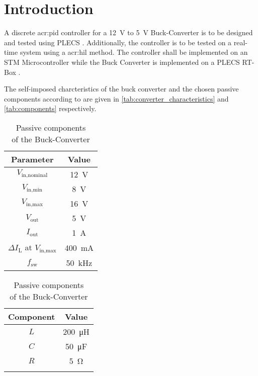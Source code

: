 \chapter{Introduction}
\label{chapter:introduction}

A discrete \gls{acr:pid} controller for a \qty{12}{\volt} to \qty{5}{\volt} Buck-Converter is to be designed and tested using PLECS \autocite{PLECSPlexim}.
Additionally, the controller is to be tested on a real-time system using a \gls{acr:hil} method. The controller shall be implemented on an STM Microcontroller while the Buck Converter is implemented on a PLECS RT-Box \autocite{RTBoxPlexim}.

The self-imposed charcteristics of the buck converter and the chosen passive components according to \autocite{BuckConverter} are given in \autoref{tab:converter_characteristics} and \autoref{tab:components} respectively.

\begin{table}[htbp]
    \centering
    \begin{minipage}{0.45\textwidth}
        \centering
        \begin{tabular}{c|c}
            Parameter & Value \\ \hline
            $V_{\text{in,nominal}}$ & \qty{12}{\volt} \\ 
            $V_{\text{in,min}}$ & \qty{8}{\volt} \\
            $V_{\text{in,max}}$ & \qty{16}{\volt} \\  
            $V_{\text{out}}$ & \qty{5}{\volt} \\ 
            $I_{\text{out}}$ & \qty{1}{\ampere} \\
            $\Delta I_{\text{L}}$ at $V_{\text{in,max}}$ & \qty{400}{\milli\ampere} \\
            $f_{\text{sw}}$ & \qty{50}{\kilo\hertz}
        \end{tabular}
        \caption{Buck-Converter Characteristics}
        \label{tab:converter_characteristics}
    \end{minipage}\hfill
    \begin{minipage}{0.45\textwidth}
        \centering
        \begin{tabular}{c|c}
            Component & Value \\ \hline
            $L$ & \qty{200}{\micro\henry} \\ 
            $C$ & \qty{50}{\micro\farad} \\ 
            $R$ & \qty{5}{\ohm} \\ 
             \\
        \end{tabular}
        \caption{Passive components \\ of the Buck-Converter}
        \label{tab:components}
    \end{minipage}
\end{table}

